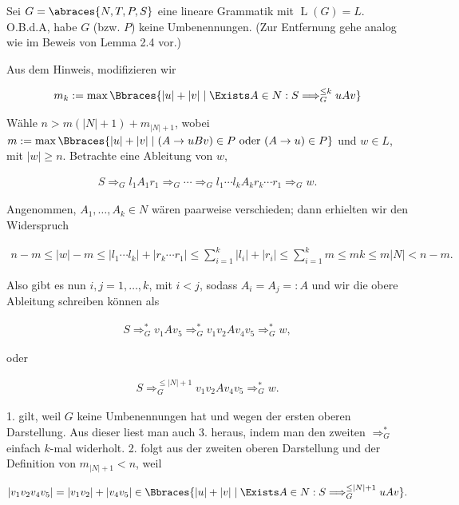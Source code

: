 \begin{solution}

Sei $G = \abraces{N, T, P, S}$ eine lineare Grammatik mit $\operatorname L(G) = L$.
O.B.d.A, habe $G$ (bzw. $P$) keine Umbenennungen.
(Zur Entfernung gehe analog wie im Beweis von Lemma 2.4 vor.)

Aus dem Hinweis, modifizieren wir

\begin{align*}
    m_k
    :=
    \max \Bbraces{|u| + |v| \mid \Exists A \in N: S \Longrightarrow_G^{\leq k} u A v}
\end{align*}

Wähle $n > m (|N| + 1) + m_{|N| + 1}$, wobei $m := \max \Bbraces{|u| + |v| \mid (A \to u B v) \in P ~\text{oder}~ (A \to u) \in P}$ und $w \in L$, mit $|w| \geq n$.
Betrachte eine Ableitung von $w$,

\begin{align*}
    S \Longrightarrow_G l_1 A_1 r_1 \Longrightarrow_G \cdots \Longrightarrow_G l_1 \cdots l_k A_k r_k \cdots r_1 \Longrightarrow_G w.
\end{align*}

Angenommen, $A_1, \dots, A_k \in N$ wären paarweise verschieden;
dann erhielten wir den Widerspruch

\begin{align*}
    n - m
    \leq
    |w| - m
    \leq
    |l_1 \cdots l_k| + |r_k \cdots r_1|
    \leq
    \sum_{i=1}^k
        |l_i| + |r_i|
    \leq
    \sum_{i=1}^k
        m
    \leq
    m k
    \leq
    m |N|
    <
    n - m.
\end{align*}

Also gibt es nun $i, j = 1, \dots, k$, mit $i < j$, sodass $A_i = A_j =: A$ und wir die obere Ableitung schreiben können als

\begin{align*}
    S \Longrightarrow_G^\ast v_1 A v_5 \Longrightarrow_G^\ast v_1 v_2 A v_4 v_5 \Longrightarrow_G^\ast w,
\end{align*}

oder

\begin{align*}
    S \Longrightarrow_G^{\leq |N| + 1} v_1 v_2 A v_4 v_5 \Longrightarrow_G^\ast w.
\end{align*}

1. gilt, weil $G$ keine Umbenennungen hat und wegen der ersten oberen Darstellung.
Aus dieser liest man auch 3. heraus, indem man den zweiten $\Longrightarrow_G^\ast$ einfach $k$-mal widerholt.
2. folgt aus der zweiten oberen Darstellung und der Definition von $m_{|N| + 1} < n$, weil

\begin{align*}
    |v_1 v_2 v_4 v_5| = |v_1 v_2| + |v_4 v_5| \in \Bbraces{|u| + |v| \mid \Exists A \in N: S \Longrightarrow_G^{\leq |N| + 1} u A v}.
\end{align*}

\end{solution}

